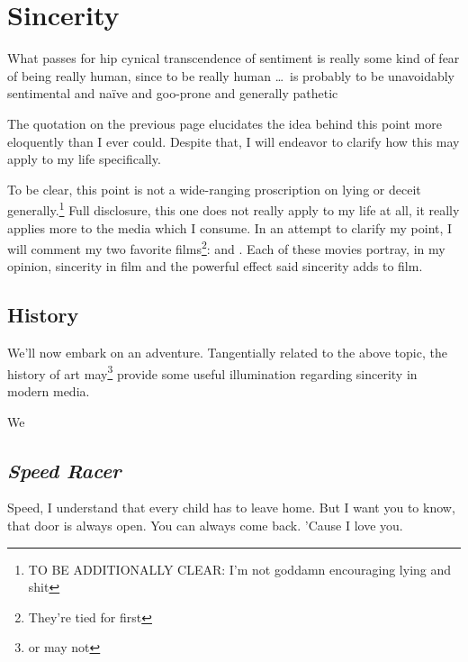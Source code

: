 \documentclass[../butidigress.tex]{subfiles}
\begin{document}
\chapter{Sincerity}
\epigraph{What passes for hip cynical transcendence of sentiment is really some kind of fear of being really human, since to be really human \dots\ is probably to be unavoidably sentimental and na\"{i}ve and goo-prone and generally pathetic}{}
\newpage

The quotation on the previous page elucidates the idea behind this point more eloquently than I ever could.
Despite that, I will endeavor to clarify how this may apply to my life specifically.

To be clear, this point is not a wide-ranging proscription on lying or deceit generally.\footnote{TO BE ADDITIONALLY CLEAR: I'm not goddamn encouraging lying and shit}
Full disclosure, this one does not really apply to my life at all, it really applies more to the media which I consume.
In an attempt to clarify my point, I will comment my two favorite films\footnote{They're tied for first}:  and .
Each of these movies portray, in my opinion, sincerity in film and the powerful effect said sincerity adds to film.

\vspace{1em}

\section{History} 
We'll now embark on an adventure.
Tangentially related to the above topic, the history of art may\footnote{or may not} provide some useful illumination regarding sincerity in modern media.

We


\section{\textit{Speed Racer}}
\epigraph{Speed, I understand that every child has to leave home. But I want you to know, that door is always open. You can always come back. 'Cause I love you.}{}
\end{document}
